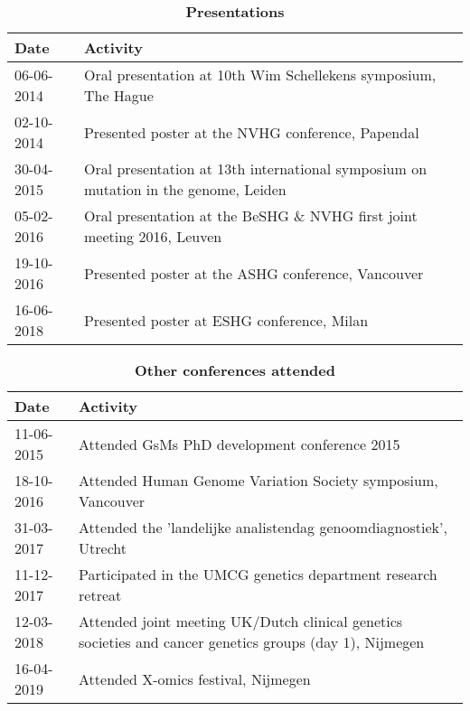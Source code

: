\begin{appendices}
\begin{table}
	\caption*{\textbf{Presentations}}
	\footnotesize
	\begin{tabulary}{\linewidth}{LL}
		Date & Activity \\
		\hline
			\rule{0pt}{2.5ex}\mbox{06-06-2014} & Oral presentation at 10th Wim Schellekens symposium, The Hague \\
			\rule{0pt}{2.5ex}\mbox{02-10-2014} & Presented poster at the NVHG conference, Papendal \\
			\rule{0pt}{2.5ex}\mbox{30-04-2015} & Oral presentation at 13th international symposium on mutation in the genome, Leiden \\
			\rule{0pt}{2.5ex}\mbox{05-02-2016} & Oral presentation at the BeSHG \& NVHG first joint meeting 2016, Leuven \\
			\rule{0pt}{2.5ex}\mbox{19-10-2016} & Presented poster at the ASHG conference, Vancouver\\
			\rule{0pt}{2.5ex}\mbox{16-06-2018} & Presented poster at ESHG conference, Milan \\
			\hline
\end{tabulary}
\label{table:appendix_activities_2}
\end{table}

\begin{table}
	\caption*{\textbf{Other conferences attended}}
	\footnotesize
	\begin{tabulary}{\linewidth}{LL}
		Date & Activity \\
		\hline
			\rule{0pt}{2.5ex}\mbox{11-06-2015} & Attended GsMs PhD development conference 2015\\
			\rule{0pt}{2.5ex}\mbox{18-10-2016} & Attended Human Genome Variation Society symposium, Vancouver\\
			\rule{0pt}{2.5ex}\mbox{31-03-2017} & Attended the 'landelijke analistendag genoomdiagnostiek', Utrecht \\
			\rule{0pt}{2.5ex}\mbox{11-12-2017} & Participated in the UMCG genetics department research retreat\\
			\rule{0pt}{2.5ex}\mbox{12-03-2018} & Attended joint meeting UK/Dutch clinical genetics societies and cancer genetics groups (day 1), Nijmegen\\
			\rule{0pt}{2.5ex}\mbox{16-04-2019} & Attended X-omics festival, Nijmegen \\
				\hline
\end{tabulary}
\label{table:appendix_activities_3}
\end{table}		
			


\end{appendices}
